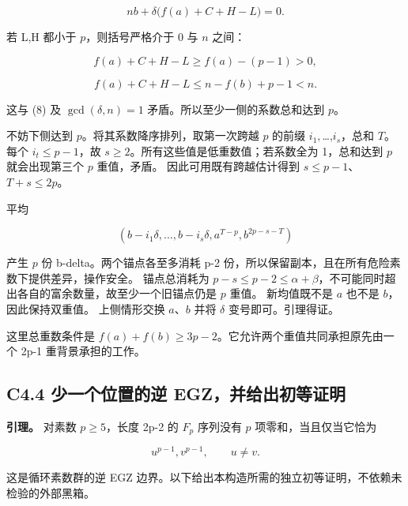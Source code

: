 \documentclass[11pt,a4paper]{article}
\theoremstyle{definition}
\numberwithin{equation}{section}
\begin{document}
\[
nb+\delta\bigl(f(a)+C+H-L\bigr)=0.
\tag{C4.8}
\]

{若} {L,H} {都小于} {\ensuremath{p}，则括号严格介于} {0} {与} {\ensuremath{n}} {之间：}

\[
f(a)+C+H-L\ge f(a)-(p-1)>0,
\]

\[
f(a)+C+H-L\le n-f(b)+p-1<n.
\]

{这与} {(8)} {及} {\ensuremath{\operatorname{gcd}(\delta ,n)=1}} {矛盾。所以至少一侧的系数总和达到} {\ensuremath{p}。}

{不妨下侧达到} {\ensuremath{p}。将其系数降序排列，取第一次跨越} {\ensuremath{p}} {的前缀} {\ensuremath{i_{1},}\ldots,\ensuremath{i_{s}}，总和} {\ensuremath{T}。} {每个} {\ensuremath{i_{t}\le p-1}，故} {\ensuremath{s\ge 2}。所有这些值是低重数值；若系数全为} {1，总和达到} {\ensuremath{p}} {就会出现第三个} {\ensuremath{p}} {重值，矛盾。} {因此可用既有跨越估计得到} {\ensuremath{s\le p-1}、\ensuremath{T+s\le 2p}。}

{平均}

\[
\boxed{(b-i_1\delta,\ldots,b-i_s\delta,
a^{T-p},b^{2p-s-T})}
\tag{C4.9}
\]

{产生} {\ensuremath{p}} {份} {b-delta。两个锚点各至多消耗} {p-2} {份，所以保留副本，且在所有危险素数下提供差异，操作安全。} {锚点总消耗为} {\ensuremath{p-s\le p-2\le \alpha +\beta }，不可能同时超出各自的富余数量，故至少一个旧锚点仍是} {\ensuremath{p}} {重值。} {新均值既不是} {\ensuremath{a}} {也不是} {\ensuremath{b}，因此保持双重值。} {上侧情形交换} {\ensuremath{a}、\ensuremath{b}} {并将} {\ensuremath{\delta }} {变号即可。引理得证。}

{这里总重数条件是} {\ensuremath{f(a)+f(b)\ge 3p-2}。它允许两个重值共同承担原先由一个} {2p-1} {重背景承担的工作。}

\subsection*{\texorpdfstring{{C4.4} {少一个位置的逆} {EGZ，并给出初等证明}}{C4.4 少一个位置的逆 EGZ，并给出初等证明}}\label{C4-h22}

\textbf{{引理。}} {对素数} {\ensuremath{p\ge 5}，长度} {2p-2} {的} {\ensuremath{F_{p}}} {序列没有} {\ensuremath{p}} {项零和，当且仅当它恰为}

\[
u^{p-1},v^{p-1},\qquad u\ne v.
\tag{C4.10}
\]

{这是循环素数群的逆} {EGZ} {边界。以下给出本构造所需的独立初等证明，不依赖未检验的外部黑箱。}
\end{document}
